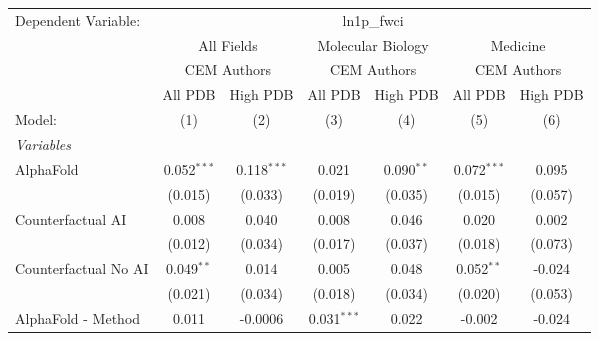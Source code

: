 \begingroup
\centering
\begin{tabular}{lcccccc}
   \tabularnewline \midrule \midrule
   Dependent Variable: & \multicolumn{6}{c}{ln1p\_fwci}\\
 & \multicolumn{2}{c}{All Fields} & \multicolumn{2}{c}{Molecular Biology} & \multicolumn{2}{c}{Medicine} \\
\cmidrule(lr){2-3} \cmidrule(lr){4-5} \cmidrule(lr){6-7}
 & \multicolumn{2}{c}{CEM Authors} & \multicolumn{2}{c}{CEM Authors} & \multicolumn{2}{c}{CEM Authors} \\
\cmidrule(lr){2-3} \cmidrule(lr){4-5} \cmidrule(lr){6-7}
 & \multicolumn{1}{c}{All PDB} & \multicolumn{1}{c}{High PDB} & \multicolumn{1}{c}{All PDB} & \multicolumn{1}{c}{High PDB} & \multicolumn{1}{c}{All PDB} & \multicolumn{1}{c}{High PDB} \\
\cmidrule(lr){2-2} \cmidrule(lr){3-3} \cmidrule(lr){4-4} \cmidrule(lr){5-5} \cmidrule(lr){6-6} \cmidrule(lr){7-7}
   Model:                                                     & (1)            & (2)             & (3)           & (4)          & (5)           & (6)\\  
   \midrule
   \emph{Variables}\\
   AlphaFold                                                  & 0.052$^{***}$  & 0.118$^{***}$   & 0.021         & 0.090$^{**}$ & 0.072$^{***}$ & 0.095\\   
                                                              & (0.015)        & (0.033)         & (0.019)       & (0.035)      & (0.015)       & (0.057)\\   
   Counterfactual AI                                          & 0.008          & 0.040           & 0.008         & 0.046        & 0.020         & 0.002\\   
                                                              & (0.012)        & (0.034)         & (0.017)       & (0.037)      & (0.018)       & (0.073)\\   
   Counterfactual No AI                                       & 0.049$^{**}$   & 0.014           & 0.005         & 0.048        & 0.052$^{**}$  & -0.024\\   
                                                              & (0.021)        & (0.034)         & (0.018)       & (0.034)      & (0.020)       & (0.053)\\   
   AlphaFold - Method                                         & 0.011          & -0.0006         & 0.031$^{***}$ & 0.022        & -0.002        & -0.024\\   

\end{tabular}
